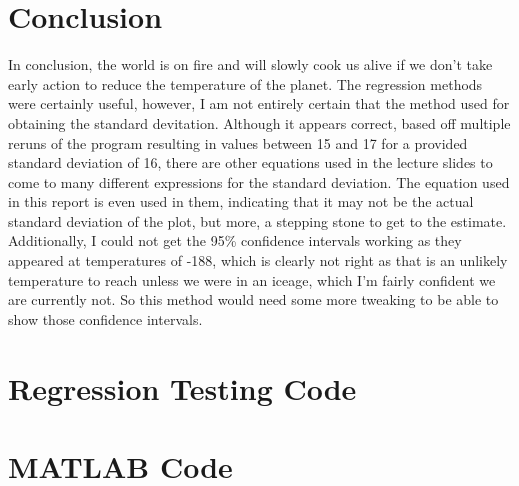 \documentclass[a4paper, 12pt]{article}
\begin{document}
    \section{Conclusion}
        In conclusion, the world is on fire and will slowly cook us alive if we don't take early action to reduce the temperature of the planet. The regression methods were certainly useful, however, I am not entirely certain that the method used for obtaining the standard devitation. Although it appears correct, based off multiple reruns of the program resulting in values between 15 and 17 for a provided standard deviation of 16, there are other equations used in the lecture slides to come to many different expressions for the standard deviation. The equation used in this report is even used in them, indicating that it may not be the actual standard deviation of the plot, but more, a stepping stone to get to the estimate. Additionally, I could not get the 95\% confidence intervals working as they appeared at temperatures of -188, which is clearly not right as that is an unlikely temperature to reach unless we were in an iceage, which I'm fairly confident we are currently not. So this method would need some more tweaking to be able to show those confidence intervals. 

    
    

    \begin{appendices}
        \section{Regression Testing Code}
            
        \section{MATLAB Code}
            
    \end{appendices}
\end{document}
